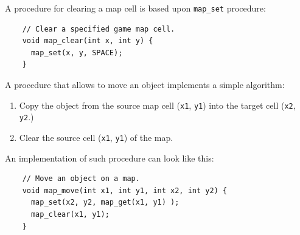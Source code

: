 \documentclass[../sparc.tex]{subfiles}
\begin{document}
A procedure for clearing a map cell is based upon \texttt{map_set}
procedure:

\begin{listing}[H]
  \begin{verbatim}
    // Clear a specified game map cell.
    void map_clear(int x, int y) {
      map_set(x, y, SPACE);
    }
  \end{verbatim}
  \caption{Implementation of \texttt{map_clear} procedure for clearing
    a map cell.}
  \label{listing:game-dev-map-get-procedure-01}
\end{listing}

A procedure that allows to move an object implements a simple algorithm:
\begin{enumerate}
\item Copy the object from the source map cell (\texttt{x1},
  \texttt{y1}) into the target cell (\texttt{x2},
  \texttt{y2}.)
\item Clear the source cell (\texttt{x1}, \texttt{y1}) of the
  map.
\end{enumerate}

An implementation of such procedure can look like this:

\begin{listing}[H]
  \begin{verbatim}
    // Move an object on a map.
    void map_move(int x1, int y1, int x2, int y2) {
      map_set(x2, y2, map_get(x1, y1) );
      map_clear(x1, y1);
    }
  \end{verbatim}
  \caption{Implementation of \texttt{map_move} procedure that allows us
    to move an object on the map.}
  \label{listing:game-dev-map-move---procedure}
\end{listing}
\end{document}
